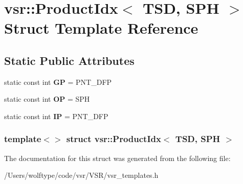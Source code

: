 \hypertarget{structvsr_1_1_product_idx_3_01_t_s_d_00_01_s_p_h_01_4}{\section{vsr\-:\-:Product\-Idx$<$ T\-S\-D, S\-P\-H $>$ Struct Template Reference}
\label{structvsr_1_1_product_idx_3_01_t_s_d_00_01_s_p_h_01_4}
}
\subsection*{Static Public Attributes}
\begin{DoxyCompactItemize}
\item 
\hypertarget{structvsr_1_1_product_idx_3_01_t_s_d_00_01_s_p_h_01_4_aaad4aa91f04942d2927e96caab1e8db8}{static const int {\bfseries G\-P} = P\-N\-T\-\_\-\-D\-F\-P}\label{structvsr_1_1_product_idx_3_01_t_s_d_00_01_s_p_h_01_4_aaad4aa91f04942d2927e96caab1e8db8}

\item 
\hypertarget{structvsr_1_1_product_idx_3_01_t_s_d_00_01_s_p_h_01_4_aecd50831d0912a0ecd4c11d159ef057b}{static const int {\bfseries O\-P} = S\-P\-H}\label{structvsr_1_1_product_idx_3_01_t_s_d_00_01_s_p_h_01_4_aecd50831d0912a0ecd4c11d159ef057b}

\item 
\hypertarget{structvsr_1_1_product_idx_3_01_t_s_d_00_01_s_p_h_01_4_a7b29e0c186469d0b7da44ba46307a78f}{static const int {\bfseries I\-P} = P\-N\-T\-\_\-\-D\-F\-P}\label{structvsr_1_1_product_idx_3_01_t_s_d_00_01_s_p_h_01_4_a7b29e0c186469d0b7da44ba46307a78f}

\end{DoxyCompactItemize}
\subsubsection*{template$<$$>$ struct vsr\-::\-Product\-Idx$<$ T\-S\-D, S\-P\-H $>$}



The documentation for this struct was generated from the following file\-:\begin{DoxyCompactItemize}
\item 
/\-Users/wolftype/code/vsr/\-V\-S\-R/vsr\-\_\-templates.\-h\end{DoxyCompactItemize}
